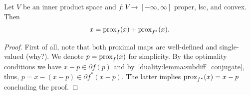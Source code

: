 \begin{theorem}\label{duality:thm:Moreau:id}
    Let $V$ be an inner product space and $f:V\rightarrow [-\infty,\infty]$ proper, lsc, and convex. Then 
    \begin{equation}
        x = \mathrm{prox}_f(x) + \mathrm{prox}_{f^*}(x).
    \end{equation}
\end{theorem}
\begin{proof}
    First of all, note that both proximal maps are well-defined and single-valued (why?). We denote $p = \mathrm{prox}_f(x)$ for simplicity. By the optimality conditions we have $x-p\in\partial f(p)$ and by~\cref{duality:lemma:subdiff_conjugate}, thus, $p = x - (x-p)\in \partial f^*(x-p)$. The latter implies $\mathrm{prox}_{f^*}(x) = x-p$ concluding the proof.
\end{proof}

